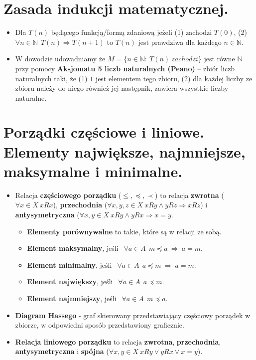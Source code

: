 \documentclass[main.tex]{subfiles}
\begin{document}
    \section{Zasada indukcji matematycznej.}

    \begin{itemize}
        \item Dla $T(n)$ będącego funkcją/formą zdaniową jeżeli (1) zachodzi $T(0)$, (2) $\forall n \in \mathbb{N} ~~ T(n) \Rightarrow T(n+1)$
        to $T(n)$ jest prawdziwa dla każdego $n \in \mathbb{N}$.

        \item W dowodzie udowadniamy że $M = \{ n \in \mathbb{N}: ~ T(n) ~ zachodzi \}$ jest równe $\mathbb{N}$ przy pomocy
        \textbf{Aksjomatu 5 liczb naturalnych (Peano)} -- zbiór liczb naturalnych taki, że (1) $1$ jest elementem
        tego zbioru, (2) dla każdej liczby ze zbioru należy do niego również jej następnik, zawiera wszystkie liczby naturalne.
    \end{itemize}


    \section{Porządki częściowe i liniowe. Elementy największe, najmniejsze, maksymalne i minimalne.}
    \begin{itemize}
        \item Relacja \textbf{częściowego porządku} ($\leqslant, \preceq, \prec$) to relacja \textbf{zwrotna} ($\forall x \in X ~ xRx$),
        \textbf{przechodnia} ($\forall x,y,z \in X ~ xRy \wedge yRz \Rightarrow xRz$) i \textbf{antysymetryczna}
        ($\forall x,y \in X ~ xRy \wedge yRx \Rightarrow x = y$.

        \begin{itemize}
            \item \textbf{Elementy porównywalne} to takie, które są w relacji ze sobą.
            \item \textbf{Element maksymalny}, jeśli $~~ \forall a \in A ~~ m \preceq a ~ \Rightarrow  ~ a = m$.
            \item \textbf{Element minimalny}, jeśli $~~ \forall a \in A ~~ a \preceq m ~ \Rightarrow  ~ a = m$.
            \item \textbf{Element największy}, jeśli $~~ \forall a \in A ~~ a \preceq m$.
            \item \textbf{Element najmniejszy}, jeśli $~~ \forall a \in A ~~ m \preceq a$.
        \end{itemize}

        \item \textbf{Diagram Hassego} - graf skierowany przedstawiający częściowy porządek w zbiorze, w odpowiedni sposób
        przedstawiony graficznie.

        \item \textbf{Relacja liniowego porządku} to relacja \textbf{zwrotna}, \textbf{przechodnia}, \textbf{antysymetryczna}
        i \textbf{spójna} ($\forall x,y \in X ~ xRy \vee yRx \vee x = y$).
    \end{itemize}
\end{document}
